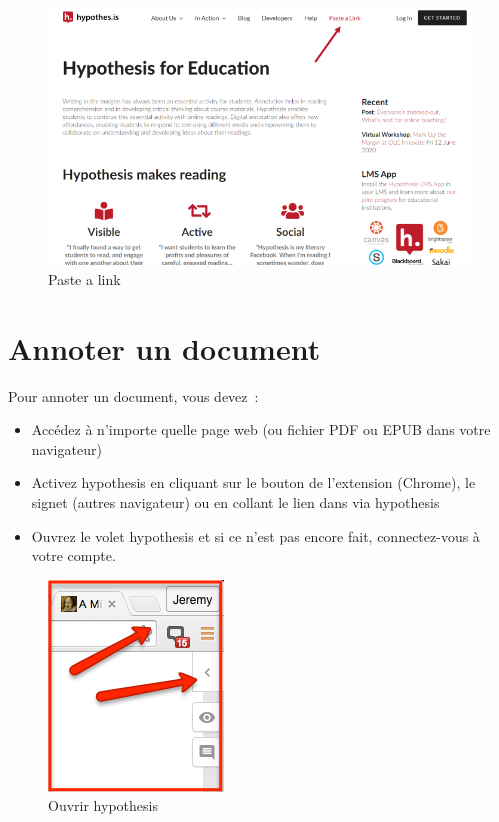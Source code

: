 \documentclass[
]{book}
\providecommand{\tightlist}{%
  \setlength{\itemsep}{0pt}\setlength{\parskip}{0pt}}
\begin{document}
\begin{figure}
\centering
\includegraphics{img/31f63f99822907f0d22ec643cca557dd.png}
\caption{Paste a link}
\end{figure}

\hypertarget{s3}{%
\chapter{Annoter un document}\label{s3}}

Pour annoter un document, vous devez~:

\begin{itemize}
\tightlist
\item
  Accédez à n'importe quelle page web (ou fichier PDF ou EPUB dans votre navigateur)
\item
  Activez hypothesis en cliquant sur le bouton de l'extension (Chrome), le signet (autres navigateur) ou en collant le lien dans via hypothesis
\item
  Ouvrez le volet hypothesis et si ce n'est pas encore fait, connectez-vous à votre compte.
\end{itemize}

\begin{figure}
\centering
\includegraphics{img/ae9a3a75e6c3a239c6fede86ebe4fa7d.png}
\caption{Ouvrir hypothesis}
\end{figure}
\end{document}
